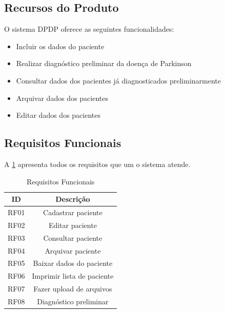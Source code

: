 \begin{anexosenv}
	\subsection{Recursos do Produto}

	O sistema DPDP oferece as seguintes funcionalidades:

	\begin{itemize}
		\item Incluir os dados do paciente
		\item Realizar diagnóstico preliminar da doença de Parkinson
		\item Consultar dados dos pacientes já diagnosticados preliminarmente
		\item Arquivar dados dos pacientes
		\item Editar dados dos pacientes
	\end{itemize}

	\subsection{Requisitos Funcionais}

	A \ref{table:Requisitos Funcionais} apresenta todos os requisitos que um o sistema atende.

	\begin{table}[ht!]
		\centering
		\caption{Requisitos Funcionais}
		\begin{tabular}{@{}|c|c|@{}}
			\hline
			\textbf{ID} & \textbf{Descrição}         \\ \hline
			RF01        & Cadastrar paciente         \\ \hline
			RF02        & Editar paciente            \\ \hline
			RF03        & Consultar paciente         \\ \hline
			RF04        & Arquivar paciente          \\ \hline
			RF05        & Baixar dados do paciente   \\ \hline
			RF06        & Imprimir lista de paciente \\ \hline
			RF07        & Fazer upload de arquivos   \\ \hline
			RF08        & Diagnóstico preliminar     \\ \hline
		\end{tabular}
		\label{table:Requisitos Funcionais}
	\end{table}


\end{anexosenv}
